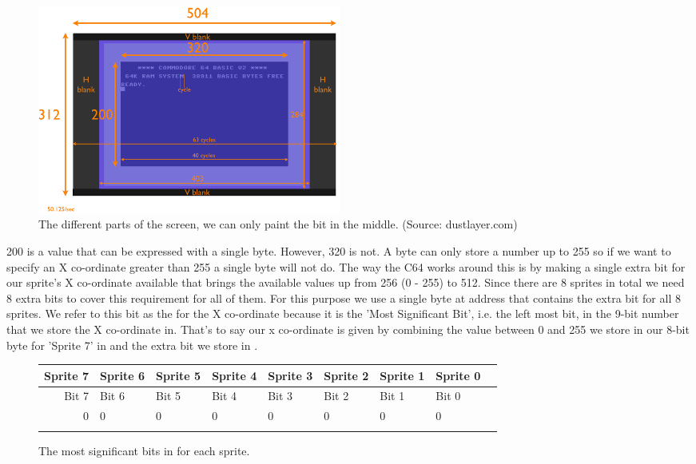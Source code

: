 \begin{figure}[H]
    \centering
      \includegraphics[width=10cm]{titlescreen/raster.png}%
  \caption{The different parts of the screen, we can only paint the bit in the middle. (Source: dustlayer.com)}
\end{figure}

200 is a value that can be expressed with a single byte. However, 320 is not. A byte can only store a number up to 255
so if we want to specify an X co-ordinate greater than 255 a single byte will not do. The way the C64 works around this
is by making a single extra bit for our sprite's X co-ordinate available that brings the available values up from 256
(0 - 255) to 512. Since there are 8 sprites in total we need 8 extra bits to cover this requirement for all of them.
For this purpose we use a single byte at address  that contains the extra bit for all 8 sprites. We refer
to this bit as the  for the X co-ordinate because it is the 'Most Significant Bit', i.e. the left most bit,
in the 9-bit number that we store the X co-ordinate in. That's to say our x co-ordinate is given by combining the value
between 0 and 255 we store in our 8-bit byte for 'Sprite 7' in  and the extra bit we store in .

\begin{figure}[H]
  {
    \setlength{\tabcolsep}{3.0pt}
    \setlength\cmidrulewidth{\heavyrulewidth} %
    \begin{adjustbox}{width=10cm,center}

      \begin{tabular}{rllllllll}
        \toprule
        Sprite 7 & Sprite 6 & Sprite 5 & Sprite 4 & Sprite 3 & Sprite 2 & Sprite 1 & Sprite 0        \\
        \midrule
        Bit 7 & Bit 6 & Bit 5 & Bit 4 & Bit 3 & Bit 2 & Bit 1 & Bit 0        \\
        \midrule
        0 & 0 & 0 & 0 & 0 & 0 & 0 & 0 \\
        \addlinespace
        \bottomrule
      \end{tabular}

    \end{adjustbox}

  }\caption*{The most significant bits in  for each sprite.}
\end{figure}


